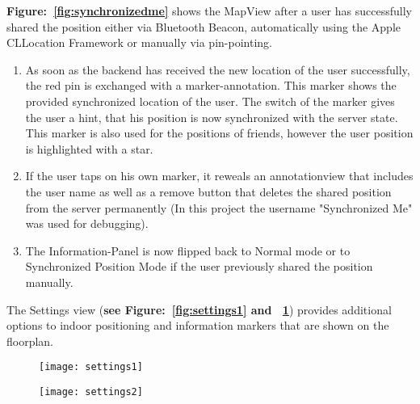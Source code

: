 \textbf{Figure:~\ref{fig:synchronizedme}} shows the MapView after a user has successfully shared the position either via Bluetooth Beacon, automatically using the Apple CLLocation Framework or manually via pin-pointing.


\begin{enumerate}
\item As soon as the backend has received the new location of the user successfully, the red pin is exchanged with a marker-annotation. This marker shows the provided synchronized location of the user. The switch of the marker gives the user a hint, that his position is now synchronized with the server state. This marker is also used for the positions of friends, however the user position is highlighted with a star.
\item If the user taps on his own marker, it reweals an annotationview that includes the user name as well as a remove button that deletes the shared position from the server permanently (In this project the username "Synchronized Me" was used for debugging).

\item The Information-Panel is now flipped back to Normal mode or to Synchronized Position Mode if the user previously shared the position manually.
\end{enumerate}


The Settings view (\textbf{see Figure:~\ref{fig:settings1} and ~\ref{fig:settings2}}) provides additional options to indoor positioning and information markers that are shown on the floorplan.

\begin{figure}
\centering
\begin{minipage}{.5\textwidth}
  \centering
  \texttt{[image: settings1]}
  \label{fig:settings1}
\end{minipage}%
\begin{minipage}{.5\textwidth}
  \centering
  \texttt{[image: settings2]}
  \label{fig:settings2}
\end{minipage}
\end{figure}

